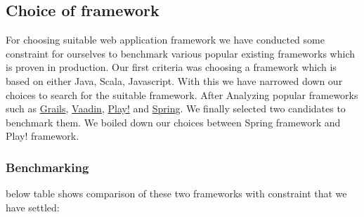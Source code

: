 \subsection{Choice of framework}
For choosing suitable web application framework we have conducted some  constraint for ourselves to benchmark various popular existing frameworks which is proven in production. Our first criteria was choosing a framework which is based on either Java, Scala, Javascript. With this we have narrowed down our choices to search for the suitable framework. After Analyzing popular frameworks such as \href{https://grails.org/}{Grails}, \href{https://vaadin.com/home}{Vaadin}, \href{https://www.playframework.com/}{Play!} and \href{http://projects.spring.io/spring-framework/}{Spring}. We finally selected two candidates to benchmark them. We boiled down our choices between Spring framework and Play! framework.\\
\subsubsection{Benchmarking}
 below table shows comparison of these two frameworks with constraint that we have settled:\\\\

